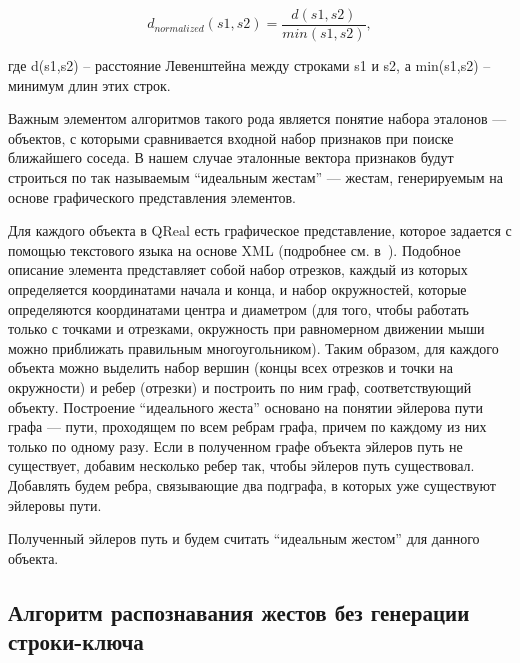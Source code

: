 \documentclass[a5paper]{article}
\begin{document}
\begin{equation}
\label{levenshtein}
d_{normalized}(s1,s2) = \frac{d(s1,s2)}{min(s1,s2)},
\end{equation}

где d(s1,s2) -- расстояние Левенштейна между строками s1 и s2, а min(s1,s2) -- минимум длин этих строк.

Важным элементом алгоритмов такого рода является понятие набора эталонов --- объектов, с которыми сравнивается входной набор признаков при 
поиске ближайшего соседа. В нашем случае эталонные вектора признаков будут строиться по так называемым ``идеальным жестам'' --- жестам,
генерируемым на основе графического представления элементов. 

Для каждого объекта в QReal есть графическое представление, которое задается с помощью текстового языка на основе XML (подробнее см. в~\cite{qreal}). 
Подобное описание элемента представляет собой набор отрезков, каждый из которых определяется координатами начала и конца, и
набор окружностей, которые определяются координатами центра и диаметром (для того, чтобы работать только с точками и отрезками, 
окружность при равномерном движении мыши можно приближать правильным многоугольником). 
Таким образом, для каждого объекта можно выделить набор вершин (концы всех отрезков и точки на окружности) и ребер (отрезки) и 
построить по ним граф, соответствующий объекту. Построение ``идеального жеста'' основано на понятии эйлерова пути графа --- 
пути, проходящем по всем ребрам графа, причем по каждому из них только по одному разу. 
Если в полученном графе объекта эйлеров путь не существует, добавим несколько ребер так, чтобы эйлеров путь существовал. 
Добавлять будем ребра, связывающие два подграфа, в которых уже существуют эйлеровы пути.

Полученный эйлеров путь и будем считать ``идеальным жестом'' для данного объекта. 


\subsection{Алгоритм распознавания жестов без генерации строки-ключа}
\end{document}
